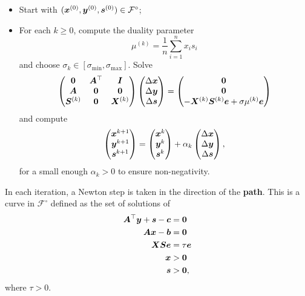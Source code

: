 \begin{itemize}
 \item Start with $(\bm{x}^{(0)},\bm{y}^{(0)},\bm{s}^{(0)})\in \mathcal{F}^{\circ}$;
 \item For each $k\geq 0$, compute the duality parameter
 \begin{equation*}
  \mu^{(k)} = \frac{1}{n} \sum_{i=1}^n x_is_i
 \end{equation*}
and choose $\sigma_k\in [\sigma_{\mathrm{min}},\sigma_{\mathrm{max}}]$. Solve
\begin{equation*}
 \begin{pmatrix}
  \bm{0} & \bm{A}^{\top} & \bm{I} \\
  \bm{A} & \bm{0} & \bm{0} \\
  \bm{S}^{(k)} & \bm{0} & \bm{X}^{(k)}
 \end{pmatrix}
\begin{pmatrix} \Delta\bm{x}\\ \Delta \bm{y}\\ \Delta\bm{s} \end{pmatrix} = \begin{pmatrix} \bm{0} \\ \bm{0} \\ -\bm{X}^{(k)}\bm{S}^{(k)}\bm{e}+\sigma \mu^{(k)}\bm{e}\end{pmatrix}
\end{equation*}
and compute
\begin{equation*}
\begin{pmatrix} \bm{x}^{k+1}\\ \bm{y}^{k+1}\\ \bm{s}^{k+1}\end{pmatrix}= \begin{pmatrix} \bm{x}^{k}\\ \bm{y}^{k}\\ \bm{s}^{k}\end{pmatrix} +\alpha_k \begin{pmatrix} \Delta\bm{x}\\ \Delta \bm{y}\\ \Delta\bm{s} \end{pmatrix},
 \end{equation*}
for a small enough $\alpha_k>0$ to ensure non-negativity.
\end{itemize}

In each iteration, a Newton step is taken in the direction of the \textbf{path}. This is a curve in $\mathcal{F}^{\circ}$ defined as the set of solutions of
\begin{align}\label{eq:cpopt}
 \begin{split}
  \bm{A}^{\top}\bm{y}+\bm{s}-\bm{c} &= \bm{0}\\
  \bm{A}\bm{x}-\bm{b} & = \bm{0}\\
  \bm{X}\bm{S}\bm{e} &= \tau \bm{e}\\
  \bm{x}&> \bm{0}\\
  \bm{s}&> \bm{0},
 \end{split}
\end{align}
where $\tau>0$. 

